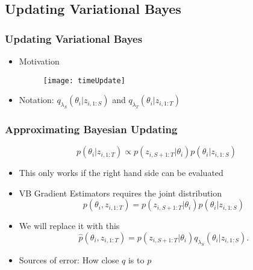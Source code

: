 \documentclass[8pt]{beamer}\usepackage[]{graphicx}\usepackage[]{color}
\begin{document}
\begin{frame}
\section{Updating Variational Bayes}
\frametitle{Updating Variational Bayes}
\begin{itemize}
\item Motivation
\begin{figure}[ht]
\centering
\texttt{[image: timeUpdate]}
\end{figure}
\item Notation: $q_{\lambda_S}(\theta_{i} | z_{i, 1:S})$ and $q_{\lambda_T}(\theta_{i} | z_{i, 1:T})$
\end{itemize}
\end{frame}

\begin{frame}
\frametitle{Approximating Bayesian Updating}
\begin{equation}
\label{updatePost}
p(\theta_{i} | z_{i, 1:T}) \propto p(z_{i, S+1:T} | \theta_{i})p(\theta_{i} | z_{i, 1:S})
\end{equation}
\begin{itemize}
\item This only works if the right hand side can be evaluated
\item VB Gradient Estimators requires the joint distribution
\begin{equation}
\label{updateJoint}
p(\theta_{i}, z_{i, 1:T}) = p(z_{i, S+1:T} | \theta_{i})p(\theta_{i} | z_{i, 1:S})
\end{equation}
\item We will replace it with this
\begin{equation}
\label{ApproxJoint}
\hat{p}(\theta_{i},  z_{i, 1:T}) = p(z_{i, S+1:T} | \theta_{i})q_{\lambda_S}(\theta_{i} | z_{i, 1:S}).
\end{equation}
\item Sources of error: How close $q$ is to $p$
\end{itemize}
\end{frame}
\end{document}
